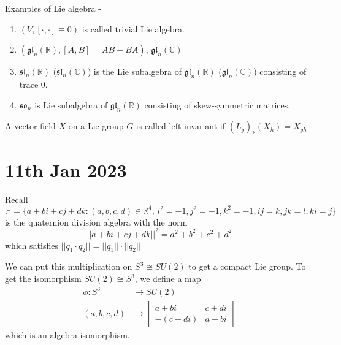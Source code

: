 \documentclass[12pt,a4paper]{article}
\theoremstyle{definition}
\theoremstyle{greenbox}
\newcommand{\R}{\mathbb{R}}
\newcommand{\C}{\mathbb{C}}
\newcommand{\Ho}{\mathbb{H}}
\begin{document}
    Examples of Lie algebra - \begin{example}
       \begin{enumerate}
        \item $ (V, [\cdot, \cdot] \equiv 0 )$ is called trivial Lie algebra. 
        \item $ (\mathfrak{gl}_{n}(\R), [A,B ]  = AB - BA )$, $ \mathfrak{gl}_{n}(\C)$
        \item $ \mathfrak{sl}_n(\R) $ ($ \mathfrak{sl}_n (\C) $) is the Lie subalgebra of $ \mathfrak{gl}_{n}(\R) $ ($ \mathfrak{gl}_{n}(\C) $)  consisting of trace $ 0 $.
        \item $ \mathfrak{so}_n $ is Lie subalgebra of $ \mathfrak{gl}_{n}(\R) $ consisting of skew-symmetric matrices.
       \end{enumerate}
    \end{example}
    \begin{defn}
        A vector field $ X $ on a Lie group $ G $ is called left invariant if $ (L_{g})_{*}(X_{h}) = X_{gh} $
    \end{defn}

    \section{11th Jan 2023}

    Recall $ \Ho =  \{a+bi+cj+dk : (a,b,c,d) \in \R^{4},  \, i^{2} = -1, j^{2} = -1, k^{2} = -1,  ij=k, jk = l, ki=j \} $ is the quaternion division algebra  with the norm 
    \[ ||a+ bi+ cj+dk||^{2} = a^{2}+ b^{2}+c^{2}+d^{2} \] which satisfies $ ||q_{1} \cdot  q_{2}|| = ||q_{1}|| \cdot ||q_{2}||$

    We can put this multiplication on $ S^{3} \cong SU(2) $ to get a compact Lie group. To get the isomorphism $ SU(2) \cong S^{3} $, we define a map 
    \begin{align*}
        \phi :S^{3} & \to SU(2)\\
            (a,b,c,d) & \mapsto \begin{bmatrix}
                a+bi & c+di\\
                -(c-di)&  a-bi
            \end{bmatrix}
    \end{align*}
    which is an algebra isomorphism. 
\end{document}
